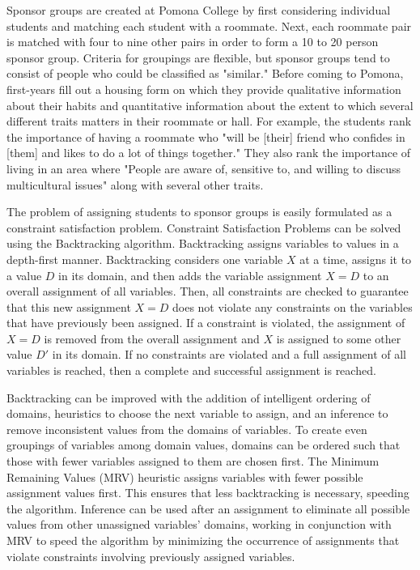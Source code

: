 \documentclass[letterpaper]{article}
\begin{document}
Sponsor groups are created at Pomona College by first considering individual students and matching each student with a roommate. Next, each roommate pair is matched with four to nine other pairs in order to form a 10 to 20 person sponsor group. Criteria for groupings are flexible, but sponsor groups tend to consist of people who could be classified as "similar." Before coming to Pomona, first-years fill out a housing form on which they provide qualitative information about their habits and quantitative information about the extent to which several different traits matters in their roommate or hall. For example, the students rank the importance of having a roommate who "will be [their] friend who confides in [them] and likes to do a lot of things together." They also rank the importance of living in an area where "People are aware of, sensitive to, and willing to discuss multicultural issues" along with several other traits.

The problem of assigning students to sponsor groups is easily formulated as a constraint satisfaction problem. Constraint Satisfaction Problems can be solved using the Backtracking algorithm. Backtracking assigns variables to values in a depth-first manner. Backtracking considers one variable $X$ at a time, assigns it to a value $D$  in its domain, and then adds the variable assignment $X=D$ to an overall assignment of all variables. Then, all constraints are checked to guarantee that this new assignment $X=D$ does not violate any constraints on the variables that have previously been assigned. If a constraint is violated, the assignment of $X=D$ is removed from the overall assignment and $X$ is assigned to some other value $D'$ in its domain. If no constraints are violated and a full assignment of all variables is reached, then a complete and successful assignment is reached. 

Backtracking can be improved with the addition of intelligent ordering of domains, heuristics to choose the next variable to assign, and an inference to remove inconsistent values from the domains of variables. To create even groupings of variables among domain values, domains can be ordered such that those with fewer variables assigned to them are chosen first. The Minimum Remaining Values (MRV) heuristic assigns variables with fewer possible assignment values first. This ensures that less backtracking is necessary, speeding the algorithm. Inference can be used after an assignment to eliminate all possible values from other unassigned variables' domains, working in conjunction with MRV to speed the algorithm by minimizing the occurrence of assignments that violate constraints involving previously assigned variables. 
\end{document}
